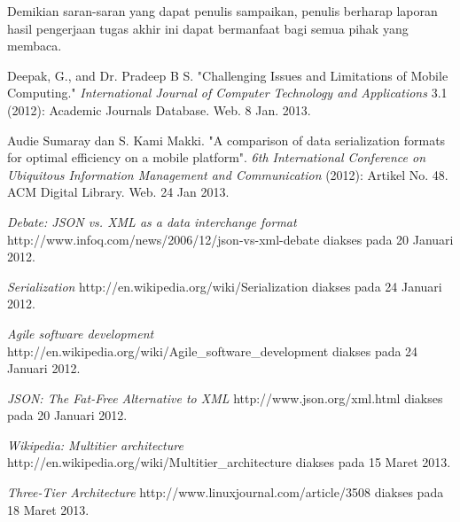 \documentclass[a4paper, 12pt, oneside]{report}
\begin{document}
Demikian saran-saran yang dapat penulis sampaikan, penulis berharap laporan hasil pengerjaan tugas akhir ini dapat bermanfaat bagi semua pihak yang membaca.

\onehalfspacing 

\begin{thebibliography}{99}
\singlespacing 


Deepak, G., and Dr. Pradeep B S. "Challenging Issues and Limitations of Mobile Computing."
  \emph{International Journal of Computer Technology and Applications} 3.1 (2012): Academic Journals Database. Web. 8 Jan. 2013.
  
Audie Sumaray dan S. Kami Makki. "A comparison of data serialization formats for optimal efficiency on a mobile platform". \emph{6th International Conference on Ubiquitous Information Management and Communication} (2012): Artikel No. 48. ACM Digital Library. Web. 24 Jan 2013.
  
  \emph{Debate: JSON vs. XML as a data interchange format}
  http://www.infoq.com/news/2006/12/json-vs-xml-debate
  diakses pada 20 Januari 2012.
  
  \emph{Serialization}
  http://en.wikipedia.org/wiki/Serialization
  diakses pada 24 Januari 2012.
  
  \emph{Agile software development}
  http://en.wikipedia.org/wiki/Agile\_software\_development
  diakses pada 24 Januari 2012.
  
  \emph{JSON: The Fat-Free Alternative to XML}
  http://www.json.org/xml.html
  diakses pada 20 Januari 2012.
  
  \emph{Wikipedia: Multitier architecture}
  http://en.wikipedia.org/wiki/Multitier\_architecture
  diakses pada 15 Maret 2013.
  
  \emph{Three-Tier Architecture}
  http://www.linuxjournal.com/article/3508
  diakses pada 18 Maret 2013.
  

\end{thebibliography}
\end{document}
